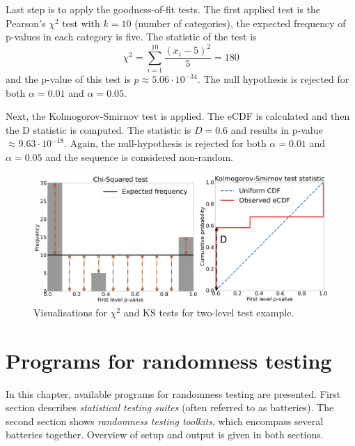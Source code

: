 \documentclass[
  digital,     %
  oneside,     %
  nosansbold,  %
  nocolorbold, %
  nolof,         %
  nolot,         %
]{fithesis4}
\begin{document}
Last step is to apply the goodness-of-fit tests. The first applied test is the Pearson's $\chi^2$ test with $k=10$ (number of categories), the expected frequency of p-values in each category is five. The statistic of the test is
\[\chi^2 = \sum_{i=1}^{10} \dfrac{(x_i - 5)^2}{5} = 180 \]
and the p-value of this test is $p\approx5.06\cdot10^{-34}$. The null hypothesis is rejected for both $\alpha = 0.01$ and $\alpha = 0.05$. 

Next, the Kolmogorov-Smirnov test is applied. The eCDF is calculated and then the D statistic is computed. The statistic is $D = 0.6$ and results in p-value $\approx 9.63\cdot10^{-18}$. Again, the null-hypothesis is rejected for both $\alpha = 0.01$ and $\alpha = 0.05$ and the sequence is considered non-random.

\begin{figure}[h]
  \begin{center}
    \includegraphics[width=12.5cm]{figures/two_example.png}
  \end{center}
  \caption{Visualisations for $\chi^2$ and KS tests for two-level test example.}
  \label{fig:two_example}
\end{figure}


\chapter{Programs for randomness testing} \label{chap:sols}
In this chapter, available programs for randomness testing are presented. First section describes \emph{statistical testing suites} (often referred to as batteries). The second section shows \emph{randomness testing toolkits}, which encompass several batteries together. Overview of setup and output is given in both sections.
\end{document}
